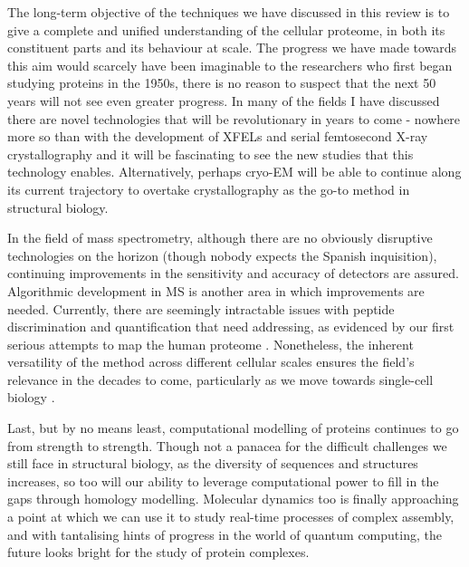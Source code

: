 \documentclass[a4paper,11pt,twoside,openright]{scrbook}
\begin{document}
The long-term objective of the techniques we have discussed in this review is to give a complete and unified understanding of the cellular proteome, in both its constituent parts and its behaviour at scale. The progress we have made towards this aim would scarcely have been imaginable to the researchers who first began studying proteins in the 1950s, there is no reason to suspect that the next 50 years will not see even greater progress. In many of the fields I have discussed there are novel technologies that will be revolutionary in years to come - nowhere more so than with the development of XFELs and serial femtosecond X-ray crystallography and it will be fascinating to see the new studies that this technology enables. Alternatively, perhaps cryo-EM will be able to continue along its current trajectory to overtake crystallography as the go-to method in structural biology.

In the field of mass spectrometry, although there are no obviously disruptive technologies on the horizon (though nobody expects the Spanish inquisition), continuing improvements in the sensitivity and accuracy of detectors are assured. Algorithmic development in MS is another area in which improvements are needed. Currently, there are seemingly intractable issues with peptide discrimination and quantification that need addressing, as evidenced by our first serious attempts to map the human proteome \cite{Kim2014,Wilhelm2014,Ezkurdia2014}. Nonetheless, the inherent versatility of the method across different cellular scales ensures the field's relevance in the decades to come, particularly as we move towards single-cell biology \cite{Macaulay2017}.

Last, but by no means least, computational modelling of proteins continues to go from strength to strength. Though not a panacea for the difficult challenges we still face in structural biology, as the diversity of sequences and structures increases, so too will our ability to leverage computational power to fill in the gaps through homology modelling. Molecular dynamics too is finally approaching a point at which we can use it to study real-time processes of complex assembly, and with tantalising hints of progress in the world of quantum computing, the future looks bright for the study of protein complexes.

\end{document}

